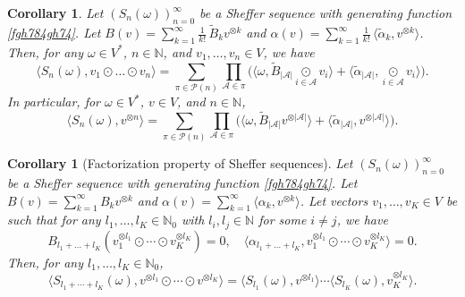 \documentclass[12pt]{article}
\newtheorem{corollary}[theorem]{Corollary}
\theoremstyle{remark}
\theoremstyle{remark}
\theoremstyle{remark}
\begin{document}
\begin{corollary}\label{dxzdrzdszrsxddx} Let $(S_n(\omega))_{n=0}^\infty$ be a Sheffer sequence with generating function \eqref{fgh784gh74}. 
 Let $B(v)=\sum_{k=1}^\infty\frac 1{k!}\,\tilde B_kv^{\otimes k}$ and $\alpha(v)=\sum_{k=1}^\infty\frac 1{k!}\,\langle \tilde \alpha_k,v^{\otimes k}\rangle$.
Then, for any $\omega\in V^*$,  $n\in\mathbb N$, and $v_1,\dots,v_n\in V$, we have 
\begin{equation}
\langle S_n(\omega),v_1\odot\dots\odot v_n\rangle=\sum_{\pi\in\mathcal P(n)}\prod_{\mathcal A\in\pi}\Big(\big\langle\omega,\tilde B_{|\mathcal A|}\underset{i\in \mathcal A}\odot v_i\big\rangle+\big\langle \tilde\alpha_{|\mathcal A|},\underset{i\in \mathcal A}\odot v_i\big\rangle\Big).\label{cxrtstset55}
\end{equation}
In particular, for $\omega\in V^*$, $v\in V$, and $n\in\mathbb N$,
\begin{equation}
\label{dxtststs}
\langle S_n(\omega),v^{\otimes n}\rangle=\sum_{\pi\in\mathcal P(n)}\prod_{\mathcal A\in\pi}\big(\langle\omega,\tilde B_{|\mathcal A|}v^{\otimes|\mathcal A|}\rangle+\langle\tilde\alpha_{|\mathcal A|},v^{\otimes|\mathcal A|}\rangle\big).
\end{equation}
\end{corollary}




\begin{corollary}[Factorization property of Sheffer sequences]\label{stesw5twu5}
Let $(S_n(\omega))_{n=0}^\infty$ be a Sheffer sequence with generating function \eqref{fgh784gh74}.   Let $B(v)=\sum_{k=1}^\infty B_kv^{\otimes k}$ and  $\alpha(v)=\sum_{k=1}^\infty\langle  \alpha_k ,v^{\otimes k}\rangle$. Let vectors $v_1,\dots,v_K\in V$ be such that for any $l_1,\dots,l_K\in \mathbb N_0$ with $l_i,l_j\in \mathbb N$ for some $i\neq j$, we have
\begin{equation*}B_{l_1+\dots+l_K}(v_1^{\otimes l_1}\odot \cdots\odot v_K^{\otimes l_K})=0,\quad \langle 
\alpha_{l_1+\dots+l_K},v_1^{\otimes l_1}\odot \cdots\odot v_K^{\otimes l_K}\rangle=0.\end{equation*}
Then, for any $l_1,\dots,l_K\in \mathbb N_0$,
\begin{equation*}
\langle S_{l_1+\cdots+l_K}(\omega), v^{\otimes l_1}\odot \cdots\odot v^{\otimes l_K}\rangle =\langle S_{l_1}(\omega),v^{\otimes l_1}\rangle\cdots \langle S_{l_K}(\omega),v_K^{\otimes l_K}\rangle.\end{equation*}
\end{corollary}
\end{document}
